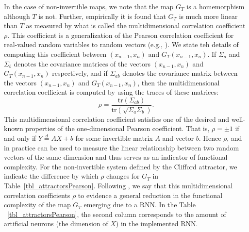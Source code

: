 \documentclass[a4paper,12pt,twoside]{report}
\begin{document}




In the case of non-invertible maps, we note that the map $G_T$ is a homemorphism although $T$ is not. Further, empirically it is found that $G_T$ is much more linear than $T$ as measured by what is called the multidimensional correlation coefficient $\rho$. This coefficient is a generalization of the Pearson correlation coefficient for real-valued random variables to random vectors (e.g., \cite{puccetti2019measuring}). We state teh details of computing this coefficient between 
$(x_{n-1},x_n)$ and $G_T(x_{n-1},x_n)$. 
If $\Sigma_{a}$ and $\Sigma_{b}$ denotes the covariance matrices of the vectors $(x_{n-1},x_n)$ and $G_T(x_{n-1},x_n)$ respectively, and if $\Sigma_{ab}$ denotes the covariance matrix between the vectors $(x_{n-1},x_n)$ and $G_T(x_{n-1},x_n)$, then the multidimensional correlation coefficient is computed by using the traces of these matrices:
\[
    \rho= \frac{\text{tr}({\Sigma_{ab}})}{\text{tr}({\sqrt{\Sigma_a\Sigma_b}})}.
\]
This multidimensional correlation coefficient satisfies one of the desired and well-known properties of the one-dimensional Pearson coefficient. That is, $\rho=\pm 1$ if and only if $Y\overset{d}{=}AX+b$ for some invertible matrix $A$ and vector $b$. Hence $\rho$, and in practice can be used  to measure the linear relationship between two random vectors of the same dimension and thus serves as an indicator of functional complexity. For the non-invertible system defined by the Clifford attractor, we indicate the difference by which $\rho$ changes for $G_T$ in Table~\ref{tbl_attractorsPearson}.
Following \cite{manjunath2021universal}, we say that this multidimensional correlation coefficients $\rho$ to evidence a general reduction in the functional complexity of the map $G_T$ emerging due to a RNN. In the 
Table ~\ref{tbl_attractorsPearson}, the second column corresponds to the amount of artificial neurons (the dimension of $X$) in the implemented RNN.
               
\end{document}
